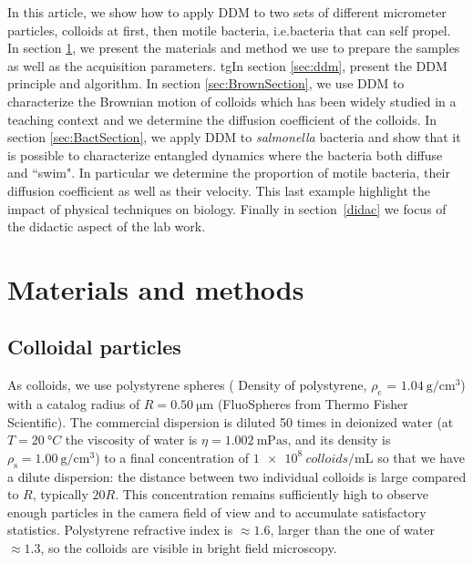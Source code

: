 \documentclass[prb,reprint,amsmath,amssymb]{revtex4-1}
\newcommand{\tg}[1]{{\color{magenta}#1}} %
\begin{document}
In this article, we show how to apply DDM to two sets of different micrometer particles, colloids at first, then motile bacteria, \tg{i.e.bacteria that can self propel}. In section \ref{materials}, we present the materials and method we use to prepare the samples as well as the acquisition parameters. tg{In section \ref{sec:ddm}, present the DDM principle and algorithm}. In section \ref{sec:BrownSection}, we \tg{use DDM to characterize the Brownian motion of colloids which has been widely studied in a teaching context and we determine the diffusion coefficient of the colloids}. In section \ref{sec:BactSection}, we apply DDM to \textit{salmonella} bacteria and show that it is possible to characterize entangled dynamics where the bacteria both diffuse and ``swim". \tg{In particular we determine the proportion of motile bacteria, their diffusion coefficient as well as their velocity}. This last example highlight the impact of physical techniques on biology. Finally in section~\ref{didac} we focus of the didactic aspect of the lab work.

\section{Materials and methods}
\label{materials}
\subsection{Colloidal particles}

As colloids, we use polystyrene spheres ( Density of polystyrene, $\rho_\text{c}$ = $\SI{1.04}{\gram\per\centi\meter\cubed}$) with a catalog radius of $R=\SI{0.50}{\micro\meter}$  (FluoSpheres\circledR{} from Thermo Fisher Scientific). The commercial dispersion is diluted 50 times in \tg{deionized} water \tg{(at $T=\SI{20}{\degree C}$ the viscosity of water is $\eta =\SI{1.002}{\milli\pascal\second}$, and its density is $\rho_\text{s}=\SI{1.00}{\gram\per\centi\meter\cubed}$)} to a final concentration of $\SI{1e8}{colloids\per\milli\liter}$ so that we have a dilute dispersion: \tg{the distance between two individual colloids} is large compared to $R$, typically $20 R$. This concentration remains sufficiently high to observe enough particles in the camera field of view and to \tg{accumulate satisfactory statistics}. Polystyrene refractive index is $\approx 1.6$, larger than the one of water $\approx 1.3$, so the colloids are visible in bright field microscopy.
\end{document}
